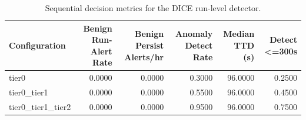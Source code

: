 \begin{table}[t]
\centering
\caption{Sequential decision metrics for the DICE run-level detector.}
\label{tab:dice_sequential_metrics}
\footnotesize
\begin{tabular}{lrrrrr}
\toprule
Configuration & Benign Run-Alert Rate & Benign Persist Alerts/hr & Anomaly Detect Rate & Median TTD (s) & Detect <=300s \\
\midrule
tier0 & 0.0000 & 0.0000 & 0.3000 & 96.0000 & 0.2500 \\
tier0_tier1 & 0.0000 & 0.0000 & 0.5500 & 96.0000 & 0.4500 \\
tier0_tier1_tier2 & 0.0000 & 0.0000 & 0.9500 & 96.0000 & 0.7500 \\
\bottomrule
\end{tabular}

\end{table}
